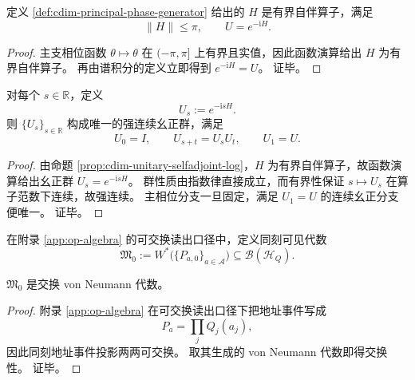 \begin{proposition}[幺正的自伴对数]\label{prop:cdim-unitary-selfadjoint-log}
定义 \ref{def:cdim-principal-phase-generator} 给出的 \(H\) 是有界自伴算子，满足
\[
\|H\|\le \pi,
\qquad
U=e^{-\mathrm iH}.
\]
\end{proposition}
\begin{proof}
主支相位函数 \(\theta\mapsto\theta\) 在 \((-\pi,\pi]\) 上有界且实值，因此函数演算给出 \(H\) 为有界自伴算子。
再由谱积分的定义立即得到 \(e^{-\mathrm iH}=U\)。
证毕。
\end{proof}

\begin{theorem}[连续时间幺正群]\label{thm:cdim-continuous-unitary-group}
对每个 \(s\in\mathbb R\)，定义
\[
U_s:=e^{-\mathrm isH}.
\]
则 \(\{U_s\}_{s\in\mathbb R}\) 构成唯一的强连续幺正群，满足
\[
U_0=I,\qquad U_{s+t}=U_sU_t,\qquad U_1=U.
\]
\end{theorem}
\begin{proof}
由命题 \ref{prop:cdim-unitary-selfadjoint-log}，\(H\) 为有界自伴算子，故函数演算给出幺正群 \(U_s=e^{-\mathrm isH}\)。
群性质由指数律直接成立，而有界性保证 \(s\mapsto U_s\) 在算子范数下连续，故强连续。
主相位分支一旦固定，满足 \(U_1=U\) 的连续幺正分支便唯一。
证毕。
\end{proof}

\begin{definition}[同刻可交换可见代数]\label{def:cdim-commutative-visible-algebra}
在附录 \ref{app:op-algebra} 的可交换读出口径中，定义同刻可见代数
\[
\mathfrak M_0:=W^\ast\bigl(\{P_{a,0}\}_{a\in\mathcal A}\bigr)\subseteq \mathcal B(\mathcal H_Q).
\]
\end{definition}

\begin{proposition}[同刻可见代数的交换性]\label{prop:cdim-commutative-visible-algebra}
\(\mathfrak M_0\) 是交换 von Neumann 代数。
\end{proposition}
\begin{proof}
附录 \ref{app:op-algebra} 在可交换读出口径下把地址事件写成
\[
P_a=\prod_j Q_j(a_j),
\]
因此同刻地址事件投影两两可交换。
取其生成的 von Neumann 代数即得交换性。
证毕。
\end{proof}

